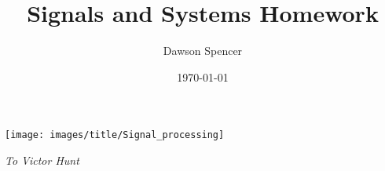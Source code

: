     \title{Signals and Systems Homework}
    \author{Dawson Spencer}
    \date{\today}
    \maketitle

    \begin{center}
        \texttt{[image: images/title/Signal\_processing]}
    \end{center}

    \vspace{1em}

    \begin{center}
        \textit{To Victor Hunt}
    \end{center}

